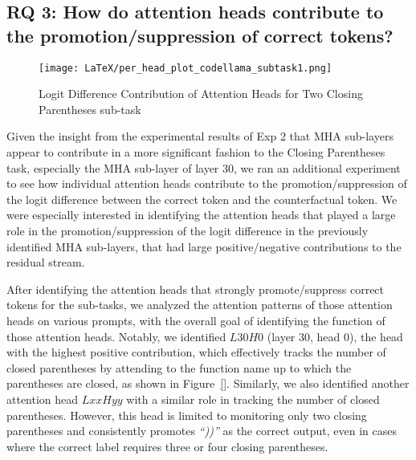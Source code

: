 \subsection{RQ 3: How do attention heads contribute to the promotion/suppression of correct tokens?}\label{subsec:exp3}

\begin{figure}[h] %
    \centering
    \texttt{[image: LaTeX/per\_head\_plot\_codellama\_subtask1.png]} %
    \caption{Logit Difference Contribution of Attention Heads for Two Closing Parentheses sub-task} %
    \label{fig:perhead_heatmap} %
\end{figure}

Given the insight from the experimental results of Exp 2 that MHA sub-layers appear to contribute in a more significant fashion to the Closing Parentheses task, especially the MHA sub-layer of layer 30, we ran an additional experiment to see how individual attention heads contribute to the promotion/suppression of the logit difference between the correct token and the counterfactual token. We were especially interested in identifying the attention heads that played a large role in the promotion/suppression of the logit difference in the previously identified MHA sub-layers, that had large positive/negative contributions to the residual stream. 
\par
After identifying the attention heads that strongly promote/suppress correct tokens for the sub-tasks, we analyzed the attention patterns of those attention heads on various prompts, with the overall goal of identifying the function of those attention heads. Notably, we identified $L30H0$ (layer 30, head 0), the head with the highest positive contribution, which effectively tracks the number of closed parentheses by attending to the function name up to which the parentheses are closed, as shown in Figure~\ref{}. Similarly, we also identified another attention head $LxxHyy$ with a similar role in tracking the number of closed parentheses. However, this head is limited to monitoring only two closing parentheses and consistently promotes \emph{``))''} as the correct output, even in cases where the correct label requires three or four closing parentheses.

